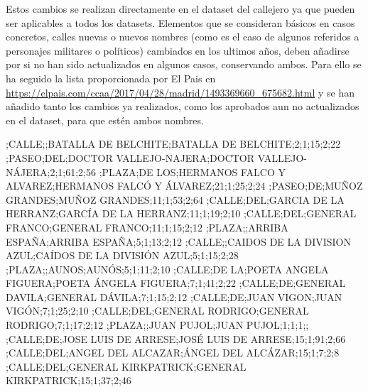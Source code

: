 \begin{itemize}
Estos cambios se realizan directamente en el dataset del callejero ya que pueden ser aplicables a todos los datasets. Elementos que se consideran básicos en casos concretos, calles nuevas o nuevos nombres (como es el caso de algunos referidos a personajes militares o políticos) cambiados en los ultimos años, deben añadirse por si no han sido actualizados en algunos casos, conservando ambos.\newline
Para ello se ha seguido la lista proporcionada por El Pais en \url{https://elpais.com/ccaa/2017/04/28/madrid/1493369660_675682.html}
y se han añadido tanto los cambios ya realizados, como los aprobados aun no actualizados en el dataset, para que estén ambos nombres.
\begin{tiny}
;CALLE;;BATALLA DE BELCHITE;BATALLA DE BELCHITE;2;1;15;2;22
;PASEO;DEL;DOCTOR VALLEJO-NAJERA;DOCTOR VALLEJO-NÁJERA;2;1;61;2;56
;PLAZA;DE LOS;HERMANOS FALCO Y ALVAREZ;HERMANOS FALCÓ Y ÁLVAREZ;21;1;25;2;24
;PASEO;DE;MUÑOZ GRANDES;MUÑOZ GRANDES;11;1;53;2;64
;CALLE;DEL;GARCIA DE LA HERRANZ;GARCÍA DE LA HERRANZ;11;1;19;2;10
;CALLE;DEL;GENERAL FRANCO;GENERAL FRANCO;11;1;15;2;12
;PLAZA;;ARRIBA ESPAÑA;ARRIBA ESPAÑA;5;1;13;2;12
;CALLE;;CAIDOS DE LA DIVISION AZUL;CAÍDOS DE LA DIVISIÓN AZUL;5;1;15;2;28
;PLAZA;;AUNOS;AUNÓS;5;1;11;2;10
;CALLE;DE LA;POETA ANGELA FIGUERA;POETA ÁNGELA FIGUERA;7;1;41;2;22
;CALLE;DE;GENERAL DAVILA;GENERAL DÁVILA;7;1;15;2;12
;CALLE;DE;JUAN VIGON;JUAN VIGÓN;7;1;25;2;10
;CALLE;DEL;GENERAL RODRIGO;GENERAL RODRIGO;7;1;17;2;12
;PLAZA;;JUAN PUJOL;JUAN PUJOL;1;1;1;;
;CALLE;DE;JOSE LUIS DE ARRESE;JOSÉ LUIS DE ARRESE;15;1;91;2;66
;CALLE;DEL;ANGEL DEL ALCAZAR;ÁNGEL DEL ALCÁZAR;15;1;7;2;8
;CALLE;DEL;GENERAL KIRKPATRICK;GENERAL KIRKPATRICK;15;1;37;2;46

\end{tiny}
\end{itemize}

